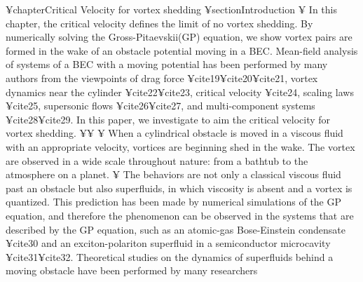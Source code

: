 {{¥chapter{Critical Velocity for vortex shedding}
¥section{Introduction}
¥ In this chapter, the critical velocity defines the limit of no vortex shedding.
By numerically solving the Gross-Pitaevskii(GP) equation,
we show vortex pairs are formed in the wake of an obstacle potential moving in a BEC.
Mean-field analysis of systems of a BEC with a moving potential has been performed by 
many authors from the viewpoints of drag force ¥cite{19}¥cite{20}¥cite{21}, vortex dynamics near the cylinder ¥cite{22}¥cite{23},
critical velocity ¥cite{24}, scaling laws ¥cite{25}, supersonic flows ¥cite{26}¥cite{27}, and multi-component systems ¥cite{28}¥cite{29}.
In this paper, we investigate to aim the critical velocity for vortex shedding.
¥¥
¥ When a cylindrical obstacle is moved in a viscous fluid with an appropriate velocity,
vortices are beginning shed in the wake.
The vortex are observed in a wide scale throughout nature: from a bathtub to 
the atmosphere on a planet.
¥ The behaviors are not only a classical viscous fluid past an obstacle but also superfluids,
in which viscosity is absent and a vortex is quantized. This prediction has been made by
numerical simulations of the GP equation, and therefore the phenomenon
can be observed in the systems that are described by the GP equation, such as an atomic-gas
Bose-Einstein condensate ¥cite{30} and an exciton-polariton superfluid in a 
semiconductor microcavity ¥cite{31}¥cite{32}. Theoretical studies on the dynamics of superfluids behind a
moving obstacle have been performed by many researchers

}}
